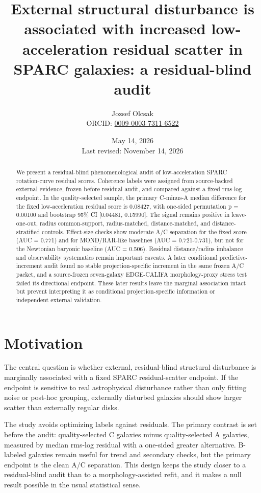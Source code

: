 \documentclass[11pt]{article}
\title{External structural disturbance is associated with increased low-acceleration residual scatter in SPARC galaxies: a residual-blind audit}
\author{Jozsef Olcsak\\{\small ORCID: \href{https://orcid.org/0009-0003-7311-6522}{0009-0003-7311-6522}}}
\date{May 14, 2026\\Last revised: November 14, 2026}
\begin{document}
\maketitle
\begin{abstract}
We present a residual-blind phenomenological audit of low-acceleration SPARC rotation-curve residual scores. Coherence labels were assigned from source-backed external evidence, frozen before residual audit, and compared against a fixed rms-log endpoint. In the quality-selected sample, the primary C-minus-A median difference for the fixed low-acceleration residual score is 0.08427, with one-sided permutation p = 0.00100 and bootstrap 95\% CI [0.04481, 0.15990]. The signal remains positive in leave-one-out, radius common-support, radius-matched, distance-matched, and distance-stratified controls. Effect-size checks show moderate A/C separation for the fixed score (AUC = 0.771) and for MOND/RAR-like baselines (AUC = 0.721-0.731), but not for the Newtonian baryonic baseline (AUC = 0.506). Residual distance/radius imbalance and observability systematics remain important caveats. A later conditional predictive-increment audit found no stable projection-specific increment in the same frozen A/C packet, and a source-frozen seven-galaxy EDGE-CALIFA morphology-proxy stress test failed its directional endpoint. These later results leave the marginal association intact but prevent interpreting it as conditional projection-specific information or independent external validation.

\end{abstract}
\section{Motivation}
The central question is whether external, residual-blind structural disturbance is marginally associated with a fixed SPARC residual-scatter endpoint. If the endpoint is sensitive to real astrophysical disturbance rather than only fitting noise or post-hoc grouping, externally disturbed galaxies should show larger scatter than externally regular disks.

The study avoids optimizing labels against residuals. The primary contrast is set before the audit: quality-selected C galaxies minus quality-selected A galaxies, measured by median rms-log residual with a one-sided greater alternative. B-labeled galaxies remain useful for trend and secondary checks, but the primary endpoint is the clean A/C separation. This design keeps the study closer to a residual-blind audit than to a morphology-assisted refit, and it makes a null result possible in the usual statistical sense.
\end{document}

